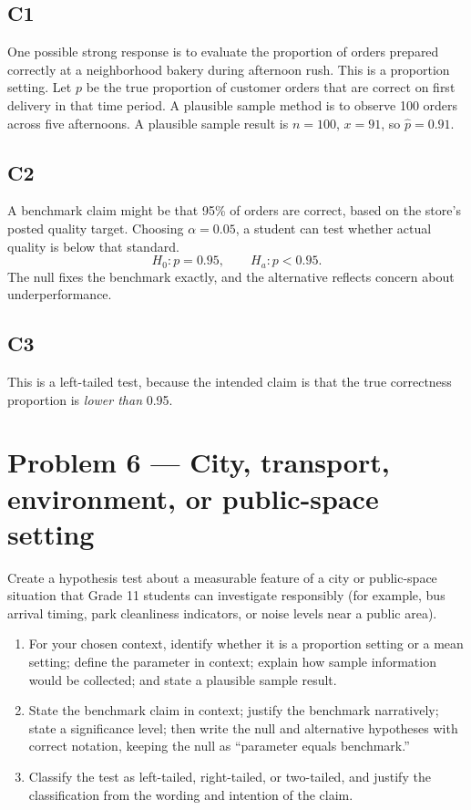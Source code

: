 	\subsection*{C1}
	One possible strong response is to evaluate the proportion of orders prepared correctly at a neighborhood bakery during afternoon rush. This is a proportion setting. Let \(p\) be the true proportion of customer orders that are correct on first delivery in that time period. A plausible sample method is to observe 100 orders across five afternoons. A plausible sample result is \(n=100\), \(x=91\), so \(\hat p=0.91\).
	
	\subsection*{C2}
	A benchmark claim might be that 95\% of orders are correct, based on the store's posted quality target. Choosing \(\alpha=0.05\), a student can test whether actual quality is below that standard.
	\[
	H_0\colon p=0.95, \qquad H_a\colon p<0.95.
	\]
	The null fixes the benchmark exactly, and the alternative reflects concern about underperformance.
	
	\subsection*{C3}
	This is a left-tailed test, because the intended claim is that the true correctness proportion is \emph{lower than} 0.95.


	\section{Problem 6 --- City, transport, environment, or public-space setting}
	Create a hypothesis test about a measurable feature of a city or public-space situation that Grade 11 students can investigate responsibly (for example, bus arrival timing, park cleanliness indicators, or noise levels near a public area).
	
	\begin{enumerate}
		\item[(C1)] For your chosen context, identify whether it is a proportion setting or a mean setting; define the parameter in context; explain how sample information would be collected; and state a plausible sample result.
		\item[(C2)] State the benchmark claim in context; justify the benchmark narratively; state a significance level; then write the null and alternative hypotheses with correct notation, keeping the null as ``parameter equals benchmark.''
		\item[(C3)] Classify the test as left-tailed, right-tailed, or two-tailed, and justify the classification from the wording and intention of the claim.
	\end{enumerate}
	
